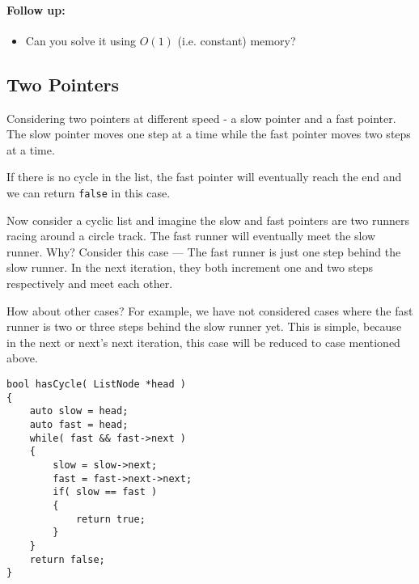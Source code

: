\paragraph{Follow up:}
\begin{itemize}
\item Can you solve it using $O(1)$ (i.e. constant) memory?
\end{itemize}
\subsection{Two Pointers}
Considering two pointers at different speed - a slow pointer and a fast pointer. The slow pointer moves one step at a time while the fast pointer moves two steps at a time.
\par
If there is no cycle in the list, the fast pointer will eventually reach the end and we can return \texttt{false} in this case.
\par
Now consider a cyclic list and imagine the slow and fast pointers are two runners racing around a circle track. The fast runner will eventually meet the slow runner. Why? Consider this case --- The fast runner is just one step behind the slow runner. In the next iteration, they both increment one and two steps respectively and meet each other.
\par
How about other cases? For example, we have not considered cases where the fast runner is two or three steps behind the slow runner yet. This is simple, because in the next or next's next iteration, this case will be reduced to case mentioned above.

\setcounter{lstlisting}{0}
\begin{lstlisting}[style=customc, caption={Two Pointers}]
bool hasCycle( ListNode *head )
{
	auto slow = head;
	auto fast = head;
    while( fast && fast->next )
    {
        slow = slow->next;
        fast = fast->next->next;
        if( slow == fast ) 
		{
			return true;
		}
    }
    return false;
}
\end{lstlisting}